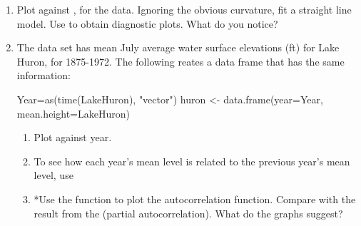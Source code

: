 \begin{enumerate}

\item Plot  against , for the
   data.  Ignoring the obvious curvature, fit a
  straight line model. Use  to obtain diagnostic
  plots.  What do you notice?
\item The data set  has
  mean July average water surface elevations (ft) for Lake Huron, for
  1875-1972. The following reates a data frame that has the
  same information:
\begin{Schunk}
\begin{Sinput}
Year=as(time(LakeHuron), "vector")
huron <- data.frame(year=Year, mean.height=LakeHuron)
\end{Sinput}
\end{Schunk}
\begin{enumerate}
\item Plot  against year.

\item To see how each year's mean level is related
to the previous year's mean level, use
\begin{Schunk}
\end{Schunk}

\item *Use the function  to plot the autocorrelation
function.  Compare with the result from the  (partial
autocorrelation).  What do the graphs suggest?
\end{enumerate}
\end{enumerate}

